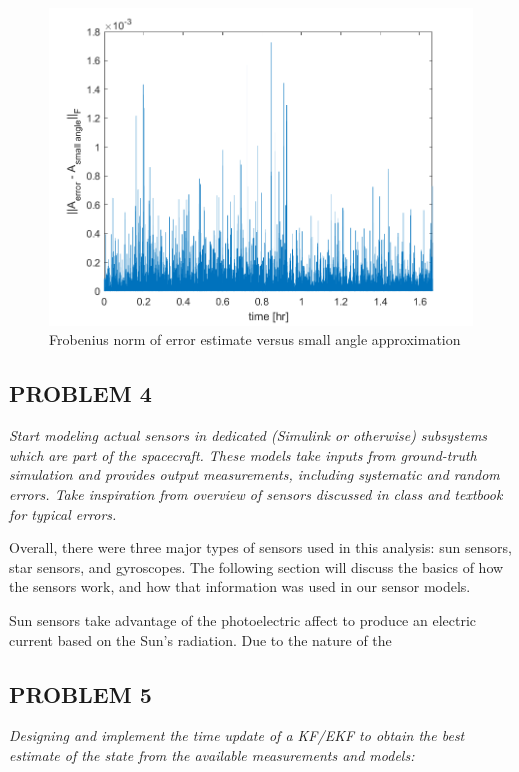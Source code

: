 \begin{figure}[H]
\centering
\includegraphics[scale=0.6]{Images/ps7_problem3.png}
\caption{Frobenius norm of error estimate versus small angle approximation}
\label{fig:ps7_problem3}
\end{figure}

\subsection{PROBLEM 4}
\textit{Start modeling actual sensors in dedicated (Simulink or otherwise) subsystems which are part of the spacecraft. These models take inputs from ground-truth simulation and provides output measurements, including systematic and random errors. Take inspiration from overview of sensors discussed in class and textbook for typical errors.}

Overall, there were three major types of sensors used in this analysis: sun sensors, star sensors, and gyroscopes. The following section will discuss the basics of how the sensors work, and how that information was used in our sensor models.

Sun sensors take advantage of the photoelectric affect to produce an electric current based on the Sun's radiation. Due to the nature of the 

\subsection{PROBLEM 5}
\textit{Designing and implement the time update of a KF/EKF to obtain the best estimate of the state from the available measurements and models:}

